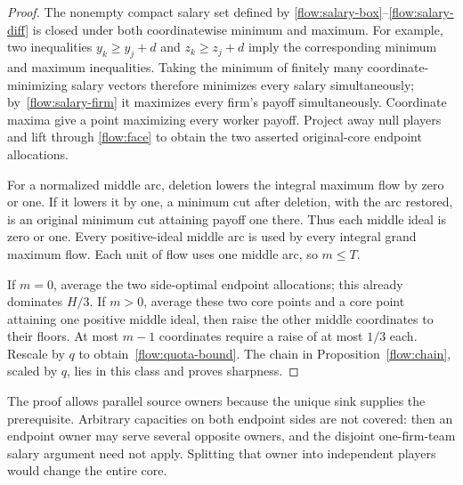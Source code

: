 \documentclass[11pt]{article}
\theoremstyle{remark}
\begin{document}
\begin{proof}
The nonempty compact salary set defined by
\eqref{flow:salary-box}--\eqref{flow:salary-diff} is closed under both
coordinatewise minimum and maximum. For example, two inequalities
$y_k\ge y_j+d$ and $z_k\ge z_j+d$ imply the corresponding minimum
and maximum inequalities. Taking the minimum of finitely many
coordinate-minimizing salary vectors therefore minimizes every salary
simultaneously; by~\eqref{flow:salary-firm} it maximizes every firm's
payoff simultaneously. Coordinate maxima give a point maximizing every
worker payoff. Project away null players and lift through
\eqref{flow:face} to obtain the two asserted original-core endpoint
allocations.

For a normalized middle arc, deletion lowers the integral maximum flow
by zero or one. If it lowers it by one, a minimum cut after deletion,
with the arc restored, is an original minimum cut attaining payoff one
there. Thus each middle ideal is zero or one. Every positive-ideal
middle arc is used by every integral grand maximum flow. Each unit of
flow uses one middle arc, so $m\le T$.

If $m=0$, average the two side-optimal endpoint allocations; this already
dominates $H/3$. If $m>0$, average these two core points and a core point
attaining one positive middle ideal, then raise the other middle
coordinates to their floors. At most $m-1$ coordinates require a raise
of at most $1/3$ each. Rescale by $q$ to obtain~\eqref{flow:quota-bound}.
The chain in Proposition~\ref{flow:chain}, scaled by $q$, lies in this
class and proves sharpness.
\end{proof}
The proof allows parallel source owners because the unique sink supplies
the prerequisite. Arbitrary capacities on both endpoint sides are not
covered: then an endpoint owner may serve several opposite owners, and
the disjoint one-firm-team salary argument need not apply. Splitting
that owner into independent players would change the entire core.
\end{document}
